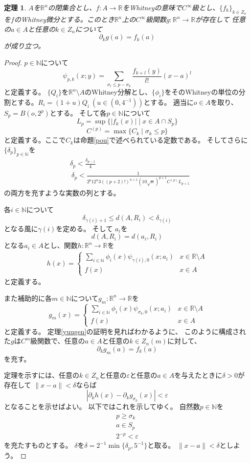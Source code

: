 \documentclass[leqno]{jsarticle}
\newtheorem{thm}{定理}
\newcommand{\nn}{\mathbb{N}}
\newcommand{\rr}{\mathbb{R}}
\newcommand{\ep}{\varepsilon}
\begin{document}
\setcounter{equation}{0}
\begin{thm}
$A$を$\rr^n$の閉集合とし、$f:A\to \rr$をWhitneyの意味で$C^{\infty}$級とし、$\{f_k\}_{k\in Z_n}$を$f$のWhitney微分とする。このとき$\rr^n$上の$C^{\infty}$級関数$g:\rr^n\to \rr$が存在して
任意の$a\in A$と任意の$k\in Z_n$について
\[
\partial_kg(a)=f_k(a)
\]
が成り立つ。
\end{thm}
\begin{proof}
$p\in \nn$について
\[
\psi_{p, k}(x;y)=\sum_{\sigma_l\le p-\sigma_k}\frac{f_{k+l}(y)}{l!}(x-a)^l
\]
と定義する。
$\{Q_i\}$を$\rr^n\setminus A$のWhitney分解とし、$\{\phi_i\}$をそのWhitneyの単位の分割とする。$R_i=(1+u)Q_i\ (u\in (0,4^{-1}))$とする。
適当に$o\in A$を取り、$S_p=B(o, 2^p)$とする。
そして各$p\in \nn$について
\[
L_p=\sup\{|f_k(x)|\mid x\in A\cap S_p\}
\]
\[
C^{(p)}=\max\{C_k\mid \sigma_k\le p\}
\]
と定義する。ここで$C_k$は命題\ref{pou}で述べられている定数である。
そしてさらに
$\{\delta_p\}_{p\in \nn}$を
\begin{align}
&\delta_p<\frac{\delta_{p-1}}{4}\\
&\ \delta_{p}<\frac{1}{2^{p}12^n3((p+2)!)^{n+1}(10\sqrt{n})^{p+1} C^{(p)}L_{p+1}}
\end{align}
の両方を充すような実数の列とする。

各$i\in \nn$について
\[
\delta_{\gamma(i)+1}\le d(A, R_i)<\delta_{\gamma(i)}
\]
となる風に$\gamma(i)$を定める。
そして
$a_i$を
\[
d(A, R_i)=d(a_i, R_i)
\]
となる$a_i\in A$とし、関数$h:\rr^n\to \rr$を
\begin{align*}
h(x)=\begin{cases}
\sum_{i\in \nn}\phi_i(x)\psi_{\gamma(i), 0}(x;a_i) & \text{$x\in \rr\setminus A$}\\
f(x) & \text{$x\in A$}
\end{cases}
\end{align*}
と定義する。

また補助的に各$m\in \nn$について$g_m:\rr^n\to \rr$を
\[
g_m(x)=
\begin{cases}
\sum_{i\in \nn}\phi_i(x)\psi_{\sigma_k,0}(x;a_i) & \text{$x\in \rr\setminus A$}\\
f(x) & \text{$x\in A$}
\end{cases}
\]
と定義する。
定理\ref{yuugen}の証明を見ればわかるように、
このように構成された$g$は$C^m$級関数で、任意の$a\in A$と任意の$k\in Z_n(m)$に対して、
\[
\partial_kg_m(a)=f_k(a)
\]
を充す。

定理を示すには、任意の$k\in Z_n$と任意の$\ep$と任意の$a\in A$を与えたときに$\delta>0$が存在して
$\|x-a\|<\delta$ならば
\[
|\partial_kh(x)-\partial_kg_{\sigma_k}(x)|<\ep
\]
となることを示せばよい。
以下ではこれを示してゆく。
自然数$p\in\nn$を
\begin{align}
p\ge \sigma_k\\
a\in S_p\\
2^{-p}<\ep
\end{align}
を充たすものとする。
$\delta$を$\delta=2^{-1}\min\{\delta_p, 5^{-1}\}$と取る。
$\|x-a\|<\delta$としよう。


\end{proof}
\end{document}
